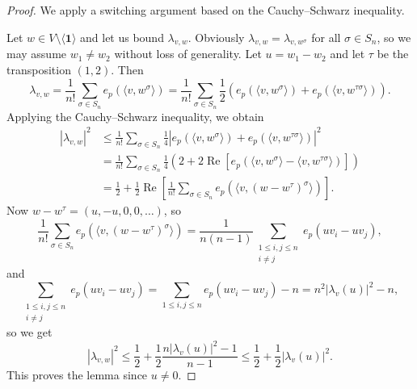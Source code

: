\documentclass[10pt,a4paper]{amsart}
\renewcommand{\Re}{\op{Re}}
\newcommand\br[1]{{\left(#1\right)}}
\newcommand{\gen}[1]{\langle{#1}\rangle}
\def\one{\mathbf{1}}
\newcommand{\op}{\operatorname}
\begin{document}
\begin{proof}
    We apply a switching argument based on the Cauchy--Schwarz inequality.

    Let $w \in V \setminus \gen\one$ and let us bound $\lambda_{v,w}$.
    Obviously $\lambda_{v, w} = \lambda_{v, w^\sigma}$ for all $\sigma \in S_n$, so we may assume $w_1 \ne w_2$ without loss of generality. Let $u = w_1 - w_2$ and let $\tau$ be the transposition $(1,2)$. Then
    \[
        \lambda_{v,w}
        = \frac1{n!} \sum_{\sigma \in S_n} e_p( \gen{v, w^\sigma})
        = \frac1{n!} \sum_{\sigma \in S_n} \frac12 \br{e_p(\gen{v, w^\sigma}) + e_p(\gen{v, w^{\tau\sigma}})}.
    \]
    Applying the Cauchy--Schwarz inequality, we obtain
    \begin{align*}
        |\lambda_{v,w}|^2
        &\le \frac1{n!} \sum_{\sigma \in S_n}
        \frac14 \left|
            e_p(\gen{v, w^\sigma}) + e_p(\gen{v, w^{\tau\sigma}})
        \right|^2 \\
        &= \frac1{n!} \sum_{\sigma \in S_n}
        \frac14 \br{
            2 + 2 \Re\left[e_p(\gen{v, w^\sigma} - \gen{v, w^{\tau\sigma}})\right]
        }\\
        &= \frac12 + \frac12 \Re\left[\frac1{n!}\sum_{\sigma \in S_n}
            e_p(\langle v, (w - w^\tau)^\sigma\rangle)
        \right].
    \end{align*}
    Now $w - w^\tau = (u, -u, 0, 0, \dots)$, so
    \[
        \frac1{n!} \sum_{\sigma \in S_n} e_p(\gen{v, (w-w^\tau)^\sigma})
        = \frac1{n(n-1)} \sum_{\substack{1 \le i, j \le n \\ i \ne j}}
        e_p(u v_i - u v_j),
    \]
    and
    \[
        \sum_{\substack{1 \le i, j \le n \\ i \ne j}} e_p(u v_i - u v_j)
        = \sum_{1 \le i, j \le n} e_p(u v_i - u v_j) - n
        = n^2 |\lambda_v(u)|^2 - n,
    \]
    so we get
    \[
        |\lambda_{v,w}|^2
        \le \frac12 + \frac12 \frac{n|\lambda_v(u)|^2 - 1}{n-1}
        \le \frac12 + \frac12 |\lambda_v(u)|^2.
    \]
    This proves the lemma since $u \ne 0$.
\end{proof}
\end{document}
